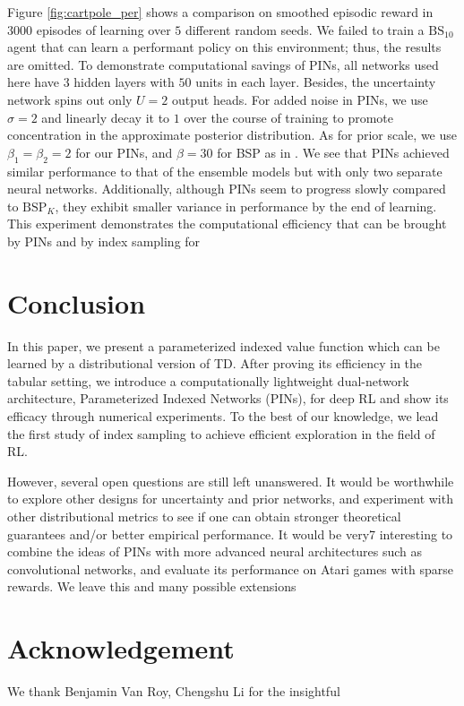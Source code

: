 \documentclass[letterpaper]{article} %
\theoremstyle{definition}
\begin{document}
Figure \ref{fig:cartpole_per} shows a comparison on smoothed episodic reward in $3000$ episodes of learning over $5$ different random seeds. We failed to train a $\mathrm{BS}_{10}$ agent that can learn a performant policy on this environment; thus, the results are omitted. To demonstrate computational savings of PINs, all networks used here have $3$ hidden layers with $50$ units in each layer. Besides, the uncertainty network spins out only $U=2$ output heads. For added noise in PINs, we use $\sigma=2$ and linearly decay it to $1$ over the course of training to promote concentration in the approximate posterior distribution. As for prior scale, we use $\beta_1=\beta_2=2$ for our PINs, and $\beta=30$ for BSP as in \cite{osband2018randomized}. We see that PINs achieved similar performance to that of the ensemble models but with only two separate neural networks. Additionally, although PINs seem to progress slowly compared to $\mathrm{BSP}_K$, they exhibit smaller variance in performance by the end of learning. This experiment demonstrates the computational efficiency that can be brought by PINs and by index sampling for

\section{Conclusion}

In this paper, we present a parameterized indexed value function which can be learned by a distributional version of TD. After proving its efficiency in the tabular setting, we introduce a computationally lightweight dual-network architecture, Parameterized Indexed Networks (PINs), for deep RL and show its efficacy through numerical experiments. To the best of our knowledge, we lead the first study of index sampling to achieve efficient exploration in the field of RL.

However, several open questions are still left unanswered. It would be worthwhile to explore other designs for uncertainty and prior networks, and experiment with other distributional metrics to see if one can obtain stronger theoretical guarantees and/or better empirical performance. It would be very7 interesting to combine the ideas of PINs with more advanced neural architectures such as convolutional networks, and evaluate its performance on Atari games with sparse rewards. We leave this and many possible extensions

\section{Acknowledgement}
We thank Benjamin Van Roy, Chengshu Li for the insightful

\medskip

\clearpage


\end{document}
